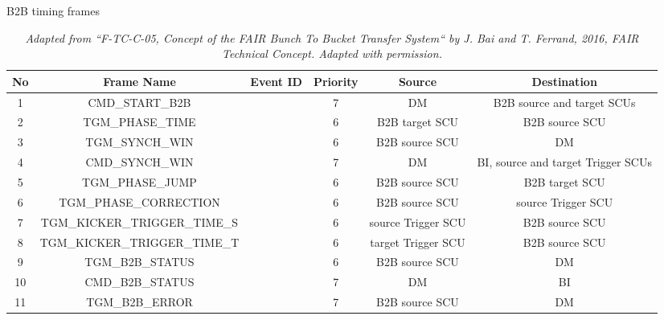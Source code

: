 \label{B2B_frame}
\begin{landscape} 
\begin{table}[!htb]
\newcommand{\tabincell}[2]{\begin{tabular}{@{}#1@{}}#2\end{tabular}}
\caption{B2B timing frames}
	\caption*{\textsl{\small{Adapted from ``F-TC-C-05, Concept of the FAIR Bunch To Bucket Transfer System`` by J. Bai and T. Ferrand, 2016, FAIR Technical Concept. Adapted with permission.}}}
\begin{center}
    \begin{tabular}{ | c | c | c | c | c | c |}
    \hline
\rowcolor[gray]{0.5}
     	No & Frame Name & Event ID & Priority & Source & Destination \\ \hline
1&	CMD\_START\_B2B&	&7&	DM&B2B source and target SCUs\\ \hline
2&	TGM\_PHASE\_TIME&	&6&	B2B target SCU&	B2B source SCU	\\ \hline
3&	TGM\_SYNCH\_WIN&	&6	&B2B source SCU&DM	\\ \hline
4&	CMD\_SYNCH\_WIN&	&7&	DM&	BI, source and target Trigger SCUs\\ \hline
5	&	TGM\_PHASE\_JUMP&&6&B2B source SCU&B2B target SCU\\ \hline
6&	TGM\_PHASE\_CORRECTION&&6&	B2B source SCU&	source Trigger SCU	\\ \hline

7&	TGM\_KICKER\_TRIGGER\_TIME\_S&&6&source Trigger SCU	&B2B source SCU\\ \hline
8&	TGM\_KICKER\_TRIGGER\_TIME\_T&	&6&	target Trigger SCU&	B2B source SCU\\ \hline

9&	TGM\_B2B\_STATUS&&6	&B2B source SCU&	DM	\\ \hline

10&	CMD\_B2B\_STATUS&	&7	&	DM	&BI \\ \hline
11&	TGM\_B2B\_ERROR&	&7&	 B2B source SCU & DM	\\ \hline


\end{tabular}
\end{center}
\end{table}
\end{landscape}
